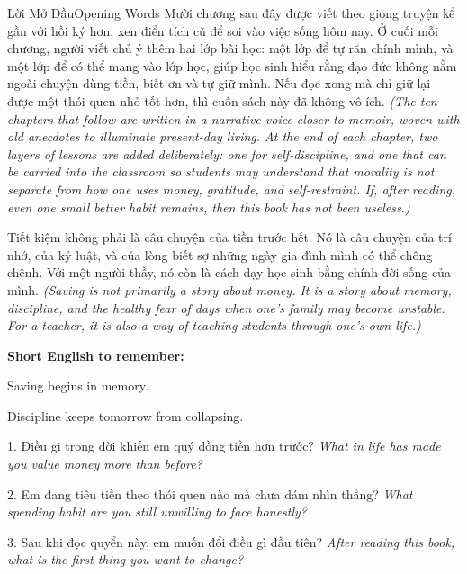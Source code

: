 \begin{truyen}{Lời Mở Đầu}{Opening Words}
Mười chương sau đây được viết theo giọng truyện kể gần với hồi ký hơn, xen điển tích cũ để soi vào việc sống hôm nay. Ở cuối mỗi chương, người viết chủ ý thêm hai lớp bài học: một lớp để tự răn chính mình, và một lớp để có thể mang vào lớp học, giúp học sinh hiểu rằng đạo đức không nằm ngoài chuyện dùng tiền, biết ơn và tự giữ mình. Nếu đọc xong mà chỉ giữ lại được một thói quen nhỏ tốt hơn, thì cuốn sách này đã không vô ích.
\textit{(The ten chapters that follow are written in a narrative voice closer to memoir, woven with old anecdotes to illuminate present-day living. At the end of each chapter, two layers of lessons are added deliberately: one for self-discipline, and one that can be carried into the classroom so students may understand that morality is not separate from how one uses money, gratitude, and self-restraint. If, after reading, even one small better habit remains, then this book has not been useless.)}
\end{truyen}

\begin{baihoc}
Tiết kiệm không phải là câu chuyện của tiền trước hết. Nó là câu chuyện của trí nhớ, của kỷ luật, và của lòng biết sợ những ngày gia đình mình có thể chông chênh. Với một người thầy, nó còn là cách dạy học sinh bằng chính đời sống của mình.
\textit{(Saving is not primarily a story about money. It is a story about memory, discipline, and the healthy fear of days when one’s family may become unstable. For a teacher, it is also a way of teaching students through one’s own life.)}
\end{baihoc}

\begin{ghinhoanh}
\textbf{Short English to remember:}

Saving begins in memory.

Discipline keeps tomorrow from collapsing.
\end{ghinhoanh}

\begin{tuhocnhanh}
1. Điều gì trong đời khiến em quý đồng tiền hơn trước? \textit{What in life has made you value money more than before?}

2. Em đang tiêu tiền theo thói quen nào mà chưa dám nhìn thẳng? \textit{What spending habit are you still unwilling to face honestly?}

3. Sau khi đọc quyển này, em muốn đổi điều gì đầu tiên? \textit{After reading this book, what is the first thing you want to change?}
\end{tuhocnhanh}

\ngancach